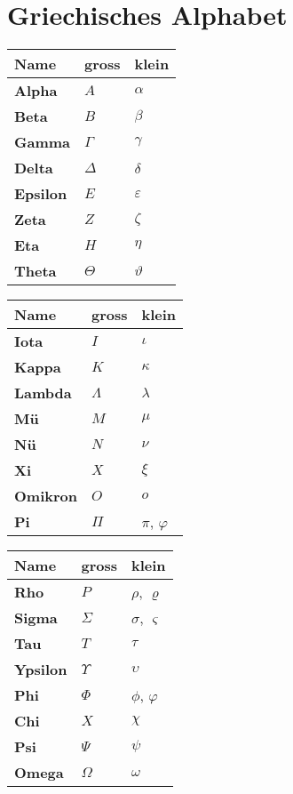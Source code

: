 \section{Griechisches Alphabet}
\setlength{\columnsep}{1.2pt}
\begin{multicols}{3}
\renewcommand{\arraystretch}{1.2}
	\begin{tabular}{|l|l|l|}
			\hline \textbf{Name} & \textbf{gross} & \textbf{klein}\\
			\hline \textbf{Alpha} &  $A$ & $\alpha$\\
			\hline \textbf{Beta} & $B$ & $\beta$ \\
			\hline \textbf{Gamma} & $\Gamma$ & $\gamma$ \\
			\hline \textbf{Delta} & $\Delta$ & $\delta$\\
			\hline \textbf{Epsilon} & $E$ & $\varepsilon$\\
			\hline \textbf{Zeta} & $Z$ & $\zeta$\\
			\hline \textbf{Eta} & $H$ & $\eta$\\
			\hline \textbf{Theta} & $\Theta$ & $\vartheta$\\
			\hline
	\end{tabular}
	
	\begin{tabular}{|l|l|l|}
		\hline \textbf{Name} & \textbf{gross} & \textbf{klein}\\
		\hline \textbf{Iota} &  $I$ & $\iota$\\
		\hline \textbf{Kappa} & $K$ & $\kappa$ \\
		\hline \textbf{Lambda} & $\Lambda$ & $\lambda$ \\
		\hline \textbf{Mü} & $M$ & $\mu$\\
		\hline \textbf{Nü} & $N$ & $\nu$\\
		\hline \textbf{Xi} & $X$ & $\xi$\\
		\hline \textbf{Omikron} & $O$ & $o$\\
		\hline \textbf{Pi} & $\Pi$ & $\pi$, $\varphi$\\
		\hline
	\end{tabular}
	
	\begin{tabular}{|l|l|l|}
		\hline \textbf{Name} & \textbf{gross} & \textbf{klein}\\
		\hline \textbf{Rho} &  $P$ & $\rho$, $\varrho$\\
		\hline \textbf{Sigma} & $\Sigma$ & $\sigma$, $\varsigma$ \\
		\hline \textbf{Tau} & $T$ & $\tau$ \\
		\hline \textbf{Ypsilon} & $\Upsilon$ & $\upsilon$\\
		\hline \textbf{Phi} & $\Phi$ & $\phi$, $\varphi$\\
		\hline \textbf{Chi} & $X$ & $\chi$\\
		\hline \textbf{Psi} & $\Psi$ & $\psi$\\
		\hline \textbf{Omega} & $\Omega$ & $\omega$\\
		\hline
	\end{tabular}	
\end{multicols}
